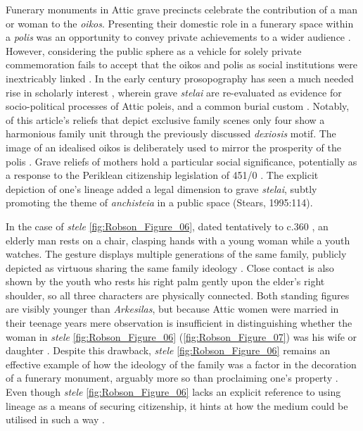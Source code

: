 Funerary monuments in Attic grave precincts celebrate the contribution of a man or woman to the \textit{oikos}. Presenting their domestic role in a funerary space within a \textit{polis} was an opportunity to convey private achievements to a wider audience \parencite[3]{Grossman2001}.
However, considering the public sphere as a vehicle for solely private commemoration fails to accept that the oikos and polis as social institutions were inextricably linked \parencite[17]{Pomeroy1997}.
In the early  century prosopography has seen a much needed rise in scholarly interest \parencite[172]{Stamatopoulou1999}, wherein grave \textit{stelai} are re-evaluated as evidence for socio-political processes of Attic poleis, and a common burial custom \parencite[25]{Stears2000b}.
Notably, of this article’s reliefs that depict exclusive family scenes only four show a harmonious family unit through the previously discussed \textit{dexiosis} motif. The image of an idealised oikos is deliberately used to mirror the prosperity of the polis \parencite[699]{Leader1997}.
Grave reliefs of mothers hold a particular social significance, potentially as a response to the Periklean citizenship legislation of 451/0 \BC \parencite[648]{Closterman2007}.
The explicit depiction of one’s lineage added a legal dimension to grave \textit{stelai}, subtly promoting the theme of \textit{anchisteia} in a public space (Stears, 1995:114).

In the case of \textit{stele} \ref{fig:Robson_Figure_06}, dated tentatively to c.360 \BC, an elderly man rests on a chair, clasping hands with a young woman while a youth watches.
The gesture displays multiple generations of the same family, publicly depicted as virtuous sharing the same family ideology \parencite[651]{Closterman2007}.
Close contact is also shown by the youth who rests his right palm gently upon the elder’s right shoulder, so all three characters are physically connected. Both standing figures are visibly younger than \textit{Arkesilas}, but because Attic women were married in their teenage years mere observation is insufficient in distinguishing whether the woman in \textit{stele} \ref{fig:Robson_Figure_06} (\ref{fig:Robson_Figure_07}) was his wife or daughter \parencite[26]{Clairmont1995}.
Despite this drawback, \textit{stele} \ref{fig:Robson_Figure_06} remains an effective example of how the ideology of the family was a factor in the decoration of a funerary monument, arguably more so than proclaiming one’s property \parencite[193]{Osborne1998}.
Even though \textit{stele} \ref{fig:Robson_Figure_06} lacks an explicit reference to using lineage as a means of securing citizenship, it hints at how the medium could be utilised in such a way \parencite[648]{Closterman2007}.

